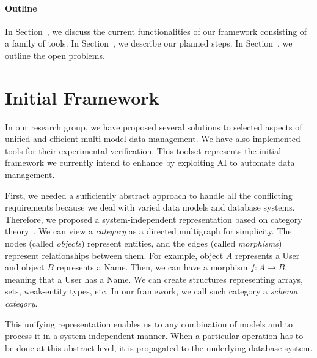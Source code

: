 \paragraph*{Outline}
In Section~, we discuss the current functionalities of our framework consisting of a family of tools. %
In Section~, we describe our planned steps. In Section~, we outline the open problems.


\section{Initial Framework}

In our research group, we have proposed several solutions to selected aspects of unified and efficient multi-model data management. We have also implemented tools for their experimental verification. This toolset represents the initial framework we currently intend to enhance by exploiting AI to automate data management.

First, we needed a sufficiently abstract approach to handle all the conflicting requirements because we deal with varied data models and database systems. Therefore, we proposed a system-independent representation based on category theory~\citep{mm_cat_journal}.
We can view a \emph{category} as a directed multigraph for simplicity. The nodes (called \emph{objects}) represent entities, and the edges (called \emph{morphisms}) represent relationships between them. For example, object $A$ represents a User and object $B$ represents a Name. Then, we can have a morphism $f: A \rightarrow B$, meaning that a User has a Name. We can create structures representing arrays, sets, weak-entity types, etc. In our framework, we call such category a \emph{schema category}.

This unifying representation enables us to  any combination of models and to process it in a system-independent manner. When a particular operation has to be done at this abstract level, it is propagated to the underlying database system.


